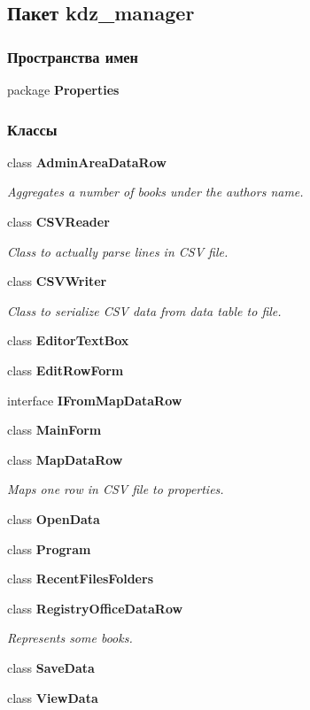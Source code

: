 \subsection{Пакет kdz\+\_\+manager}
\label{namespacekdz__manager}
\subsubsection*{Пространства имен}
\begin{DoxyCompactItemize}
\item 
package {\bf Properties}
\end{DoxyCompactItemize}
\subsubsection*{Классы}
\begin{DoxyCompactItemize}
\item 
class {\bf Admin\+Area\+Data\+Row}
\begin{DoxyCompactList}\small\item\em Aggregates a number of books under the author\textquotesingle{}s name. \end{DoxyCompactList}\item 
class {\bf C\+S\+V\+Reader}
\begin{DoxyCompactList}\small\item\em Class to actually parse lines in C\+S\+V file. \end{DoxyCompactList}\item 
class {\bf C\+S\+V\+Writer}
\begin{DoxyCompactList}\small\item\em Class to serialize C\+S\+V data from data table to file. \end{DoxyCompactList}\item 
class {\bf Editor\+Text\+Box}
\item 
class {\bf Edit\+Row\+Form}
\item 
interface {\bf I\+From\+Map\+Data\+Row}
\item 
class {\bf Main\+Form}
\item 
class {\bf Map\+Data\+Row}
\begin{DoxyCompactList}\small\item\em Maps one row in C\+S\+V file to properties. \end{DoxyCompactList}\item 
class {\bf Open\+Data}
\item 
class {\bf Program}
\item 
class {\bf Recent\+Files\+Folders}
\item 
class {\bf Registry\+Office\+Data\+Row}
\begin{DoxyCompactList}\small\item\em Represents some books. \end{DoxyCompactList}\item 
class {\bf Save\+Data}
\item 
class {\bf View\+Data}
\end{DoxyCompactItemize}
